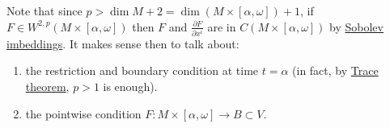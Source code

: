 \begin{remark}
Note that since \(p > \dim M + 2 = \dim (M\times [\alpha,\omega])+1\), if \(F\in
W^{2,p}(M\times[\alpha,\omega])\) then \(F\) and \(\frac{\partial F}{\partial
x^i}\) are in \(C(M\times[\alpha,\omega])\) by \href{sobolev-riemannian.org}{Sobolev imbeddings}. It makes sense then to talk
about:
\begin{enumerate}
\item the restriction and boundary condition at time \(t=\alpha\) (in fact, by \href{interpolation-sobolev.org}{Trace theorem}, \(p>1\) is enough).
\item the pointwise condition \(F: M\times [\alpha,\omega] \longrightarrow
   B\subset V\).
\end{enumerate}
\end{remark}

